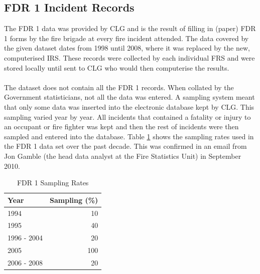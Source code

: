 \documentclass[table,a4paper,oneside]{book}
\begin{document}
\subsection{FDR 1 Incident Records}
\label{sec:FDR 1 Incident Records}
The FDR 1 data was provided by \ac{CLG} and is the result of filling in (paper) FDR 1 forms by the fire brigade at every fire incident attended. The data covered by the given dataset dates from 1998 until 2008, where it was replaced by the new, computerised \ac{IRS}. These records were collected by each individual \ac{FRS} and were stored locally until sent to \ac{CLG} who would then computerise the results.
\\
\\
The dataset does not contain all the FDR 1 records. When collated by the Government statisticians, not all the data was entered. A sampling system meant that only some data was inserted into the electronic database kept by \ac{CLG}. This sampling varied year by year. All incidents that contained a fatality or injury to an occupant or fire fighter was kept and then the rest of incidents were then sampled and entered into the database. Table \ref{tab:Sampling_Rates} shows the sampling rates used in the FDR 1 data set over the past decade. This was confirmed in an email from Jon Gamble (the head data analyst at the Fire Statistics Unit) in September 2010.

\begin{table}[htbp]
	\begin{center}
	\begin{tabular}{lr}
		\toprule
		\textbf{Year}	& \textbf{Sampling (\%)} \\
		\midrule
		1994	&	10 \\
		1995	&	40 \\
		1996 - 2004	&	20 \\
		2005	&	100 \\
		2006 - 2008	&	20 \\
		\bottomrule
	\end{tabular}
	\end{center}
\caption{FDR 1 Sampling Rates}
\label{tab:Sampling_Rates}
\end{table}
\end{document}
